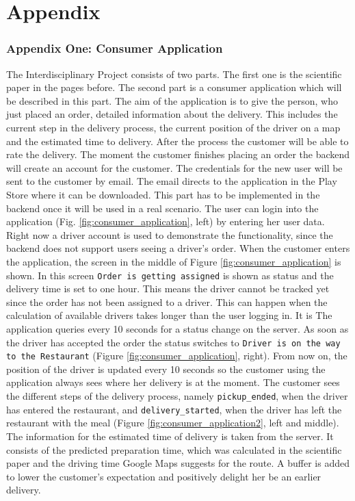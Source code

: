 \part*{Appendix}
\renewcommand{\thesection}{\arabic{section}}
\renewcommand{\theequation}{\arabic{equation}}
\section{Appendix One: Consumer Application}\label{section:Appendix One: Consumer Application}

The Interdisciplinary Project consists of two parts. The first one is the scientific paper in the pages before. The second part is a consumer application which will be described in this part.\newline
The aim of the application is to give the person, who just placed an order, detailed  information about the delivery. This includes the current step in the delivery process, the current position of the driver on a map and the estimated time to delivery. After the process the customer will be able to rate the delivery.\newline
The moment the customer finishes placing an order the backend will create an account for the customer. The credentials for the new user will be sent to the customer by email. The email directs to the application in the Play Store where it can be downloaded. This part has to be implemented in the backend once it will be used in a real scenario.\newline
The user can login into the application (Fig. \ref{fig:consumer_application}, left) by entering her user data. Right now a driver account is used to demonstrate the functionality, since the backend does not support users seeing a driver’s order.\newline
When the customer enters the application, the screen in the middle of Figure \ref{fig:consumer_application} is shown. In this screen \texttt{Order is getting assigned} is shown as status and the delivery time is set to one hour. This means the driver cannot be tracked yet since the order has not been assigned to a driver. This can happen when the calculation of available drivers takes longer than the user logging in. It is \newline
The application queries every 10 seconds for a status change on the server. As soon as the driver has accepted the order the status switches to \texttt{Driver is on the way to the Restaurant} (Figure \ref{fig:consumer_application}, right). From now on, the position of the driver is updated every 10 seconds so the customer using the application always sees where her delivery is at the moment. The customer sees the different steps of the delivery process, namely \texttt{pickup\_ended}, when the driver has entered the restaurant, and \texttt{delivery\_started}, when the driver has left the restaurant with the meal (Figure \ref{fig:consumer_application2}, left and middle). The information for the estimated time of delivery is taken from the server. It consists of the predicted preparation time, which was calculated in the scientific paper and the driving time Google Maps suggests for the route. A buffer is added to lower the customer's expectation and positively delight her be an earlier delivery.
